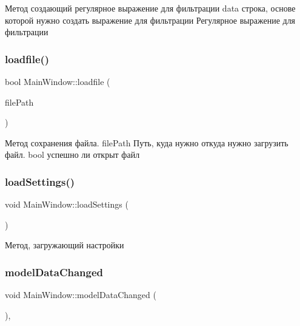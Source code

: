 Метод создающий регулярное выражение для фильтрации data строка, основе которой нужно создать выражение для фильтрации Регулярное выражение для фильтрации \mbox{\label{class_main_window_af86d3fdd62f9df452ddc9193c061ceee}} 
\subsubsection{\texorpdfstring{loadfile()}{loadfile()}}
{\footnotesize\ttfamily bool Main\+Window\+::loadfile (\begin{DoxyParamCaption}\item[{Q\+String}]{file\+Path }\end{DoxyParamCaption})\hspace{0.3cm}{\ttfamily [private]}}

Метод сохранения файла. file\+Path Путь, куда нужно откуда нужно загрузить файл. bool успешно ли открыт файл \mbox{\label{class_main_window_a9bb1f3b7f6b5360abfd2dc01fc1c8930}} 
\subsubsection{\texorpdfstring{loadSettings()}{loadSettings()}}
{\footnotesize\ttfamily void Main\+Window\+::load\+Settings (\begin{DoxyParamCaption}{ }\end{DoxyParamCaption})\hspace{0.3cm}{\ttfamily [private]}}

Метод, загружающий настройки \mbox{\label{class_main_window_a9ce11039afd283f8f793e8c44a08f3c9}} 
\subsubsection{\texorpdfstring{modelDataChanged}{modelDataChanged}}
{\footnotesize\ttfamily void Main\+Window\+::model\+Data\+Changed (\begin{DoxyParamCaption}{ }\end{DoxyParamCaption})\hspace{0.3cm}{\ttfamily [private]}, {\ttfamily [slot]}}

